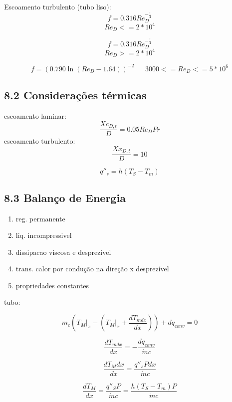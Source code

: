 Escoamento turbulento (tubo liso): 
\[f=0.316 Re_{D}^{-\frac{1}{4}}\]
\[Re_{D} <= 2 * 10^{4}\]

\[f=0.316 Re_{D}^{-\frac{1}{4}}\]
\[Re_{D} >= 2*10^{4}\]

\[ f = (0.790 \ln (Re_{D} -1.64))^{-2}\ \ \ \ \ \ \ 3000 <= Re_{D} <= 5 * 10^{6} \]

\subsection*{8.2 Considerações térmicas}



escoamento laminar: 
\[\frac{Xc_{D,t}}{D}=0.05Re_{D}Pr\]
escoamento turbulento:
\[\frac{Xx_{D,t}}{D}=10\]

\[q''_{s}=h(T_{S}-T_{m})\]

\subsection*{8.3 Balanço de Energia}

\begin{enumerate}
\item reg. permanente
\item liq. incompressivel
\item dissipacao viscosa e desprezivel
\item trans. calor por condução na direção x desprezível
\item propriedades constantes
\end{enumerate}


tubo:

\[m_{c} ( T_{M}|_{x} - ( T_{M}|_{x} + \frac{dT_{m dx}}{dx} ) ) + dq_{conv} = 0\]

\[\frac{dT_{m dx}}{dx} = - \frac{dq_{conv}}{\dot{m}c}\]

\[\frac{dT_{M} dx}{dx} = \frac{q''_{s} Pdx}{\dot{m}c}\]

\[\frac{dT_{M}}{dx}= \frac{q''_{S} P}{\dot{m}c} = \frac{h(T_{S} - T_{m}) P}{\dot{m}c}\]

